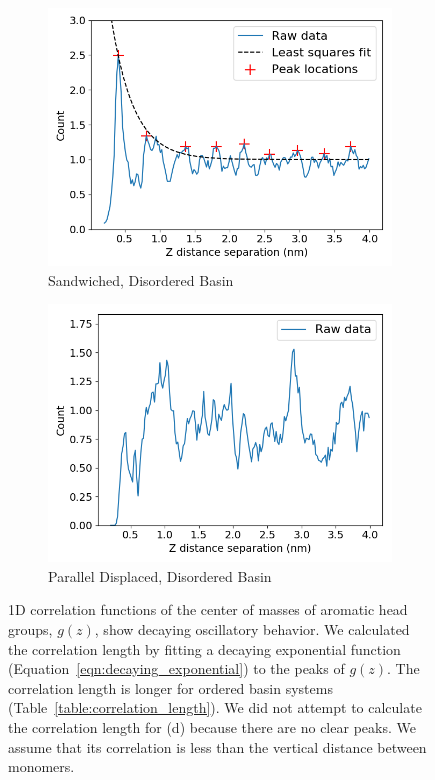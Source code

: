 \documentclass[journal=jpcbfk,manuscript=article]{achemso}
\begin{document}
\begin{figure}[!htb]
\begin{subfigure}{0.45\textwidth}
  \includegraphics[width=\textwidth]{z_correlation_sandwich_disordered.png}
  \caption{Sandwiched, Disordered Basin}\label{fig:z_correlation_sandwich_disordered}
  \end{subfigure}  
  \begin{subfigure}{0.45\textwidth}
  \centering
  \includegraphics[width=\textwidth]{z_correlation_offset_disordered.png}
  \caption{Parallel Displaced, Disordered Basin}\label{fig:z_correlation_offset_disordered}
  \end{subfigure}  
  \caption{1D correlation functions of the center of masses of aromatic head groups, $g(z)$, show
  decaying oscillatory behavior. We calculated the correlation length by fitting a decaying exponential
  function (Equation~\ref{eqn:decaying_exponential}) to the peaks of $g(z)$. The correlation length is
  longer for ordered basin systems (Table~\ref{table:correlation_length}).
  We did not attempt to calculate the correlation length for (d) because there are no clear peaks. We 
  assume that its correlation is less than the vertical distance between monomers.}\label{fig:correlation}
  \end{figure}
  
\end{document}
